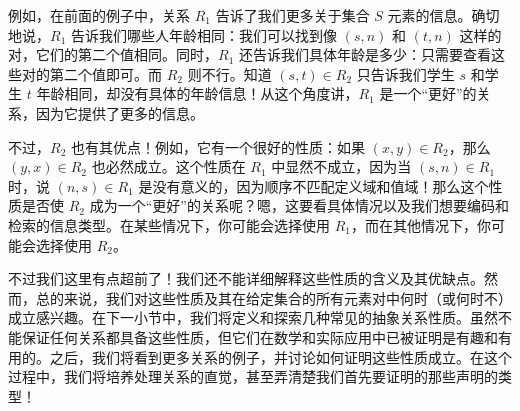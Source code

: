 例如，在前面的例子中，关系 $R_1$ 告诉了我们更多关于集合 $S$ 元素的信息。确切地说，$R_1$ 告诉我们哪些人年龄相同：我们可以找到像 $(s, n)$ 和 $(t, n)$ 这样的对，它们的第二个值相同。同时，$R_1$ 还告诉我们具体年龄是多少：只需要查看这些对的第二个值即可。而 $R_2$ 则不行。知道 $(s, t) \in R_2$ 只告诉我们学生 $s$ 和学生 $t$ 年龄相同，却没有具体的年龄信息！从这个角度讲，$R_1$ 是一个``更好''的关系，因为它提供了更多的信息。

不过，$R_2$ 也有其优点！例如，它有一个很好的性质：如果 $(x, y) \in R_2$，那么 $(y, x) \in R_2$ 也必然成立。这个性质在 $R_1$ 中显然不成立，因为当 $(s, n) \in R_1$ 时，说 $(n, s) \in R_1$ 是没有意义的，因为顺序不匹配定义域和值域！那么这个性质是否使 $R_2$ 成为一个``更好''的关系呢？嗯，这要看具体情况以及我们想要编码和检索的信息类型。在某些情况下，你可能会选择使用 $R_1$，而在其他情况下，你可能会选择使用 $R_2$。

不过我们这里有点超前了！我们还不能详细解释这些性质的含义及其优缺点。然而，总的来说，我们对这些性质及其在给定集合的所有元素对中何时（或何时不）成立感兴趣。在下一小节中，我们将定义和探索几种常见的抽象关系性质。虽然不能保证任何关系都具备这些性质，但它们在数学和实际应用中已被证明是有趣和有用的。之后，我们将看到更多关系的例子，并讨论如何证明这些性质成立。在这个过程中，我们将培养处理关系的直觉，甚至弄清楚我们首先要证明的那些声明的类型！